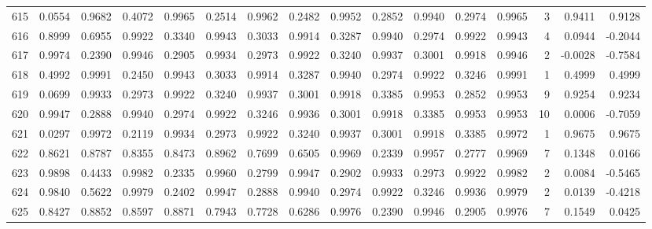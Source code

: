 \begin{tabular}{lrrrrrrrrrrrrrrr}
615 &      0.0554 &  0.9682 &  0.4072 &  0.9965 &  0.2514 &  0.9962 &  0.2482 &  0.9952 &  0.2852 &  0.9940 &   0.2974 &     0.9965 &      3 &                    0.9411 &                     0.9128 \\
616 &      0.8999 &  0.6955 &  0.9922 &  0.3340 &  0.9943 &  0.3033 &  0.9914 &  0.3287 &  0.9940 &  0.2974 &   0.9922 &     0.9943 &      4 &                    0.0944 &                    -0.2044 \\
617 &      0.9974 &  0.2390 &  0.9946 &  0.2905 &  0.9934 &  0.2973 &  0.9922 &  0.3240 &  0.9937 &  0.3001 &   0.9918 &     0.9946 &      2 &                   -0.0028 &                    -0.7584 \\
618 &      0.4992 &  0.9991 &  0.2450 &  0.9943 &  0.3033 &  0.9914 &  0.3287 &  0.9940 &  0.2974 &  0.9922 &   0.3246 &     0.9991 &      1 &                    0.4999 &                     0.4999 \\
619 &      0.0699 &  0.9933 &  0.2973 &  0.9922 &  0.3240 &  0.9937 &  0.3001 &  0.9918 &  0.3385 &  0.9953 &   0.2852 &     0.9953 &      9 &                    0.9254 &                     0.9234 \\
620 &      0.9947 &  0.2888 &  0.9940 &  0.2974 &  0.9922 &  0.3246 &  0.9936 &  0.3001 &  0.9918 &  0.3385 &   0.9953 &     0.9953 &     10 &                    0.0006 &                    -0.7059 \\
621 &      0.0297 &  0.9972 &  0.2119 &  0.9934 &  0.2973 &  0.9922 &  0.3240 &  0.9937 &  0.3001 &  0.9918 &   0.3385 &     0.9972 &      1 &                    0.9675 &                     0.9675 \\
622 &      0.8621 &  0.8787 &  0.8355 &  0.8473 &  0.8962 &  0.7699 &  0.6505 &  0.9969 &  0.2339 &  0.9957 &   0.2777 &     0.9969 &      7 &                    0.1348 &                     0.0166 \\
623 &      0.9898 &  0.4433 &  0.9982 &  0.2335 &  0.9960 &  0.2799 &  0.9947 &  0.2902 &  0.9933 &  0.2973 &   0.9922 &     0.9982 &      2 &                    0.0084 &                    -0.5465 \\
624 &      0.9840 &  0.5622 &  0.9979 &  0.2402 &  0.9947 &  0.2888 &  0.9940 &  0.2974 &  0.9922 &  0.3246 &   0.9936 &     0.9979 &      2 &                    0.0139 &                    -0.4218 \\
625 &      0.8427 &  0.8852 &  0.8597 &  0.8871 &  0.7943 &  0.7728 &  0.6286 &  0.9976 &  0.2390 &  0.9946 &   0.2905 &     0.9976 &      7 &                    0.1549 &                     0.0425 \\

\end{tabular}
